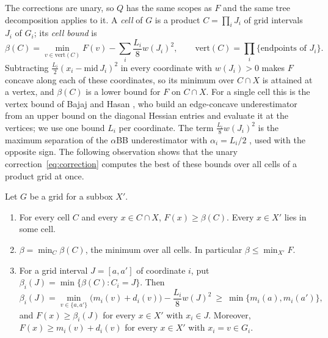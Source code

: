 The corrections are unary, so $Q$ has the same scopes as $F$ and the same
tree decomposition applies to it. A \emph{cell} of $G$ is a product
$C=\prod_iJ_i$ of grid intervals $J_i$ of $G_i$; its \emph{cell bound} is
\[
\beta(C)=\min_{v\in\mathrm{vert}(C)}F(v)-\sum_i\frac{L_i}{8}w(J_i)^2,
\qquad\mathrm{vert}(C)=\prod_i\{\text{endpoints of }J_i\}.
\]
Subtracting $\frac{L_i}2(x_i-\mathrm{mid}\,J_i)^2$ in every coordinate with
$w(J_i)>0$ makes $F$ concave along each of these coordinates, so its minimum
over $C\cap X$ is attained at a vertex, and $\beta(C)$ is a lower bound for
$F$ on $C\cap X$. For a single cell
this is the vertex bound of Bajaj and Hasan \cite{BajajHasan2020}, who build
an edge-concave underestimator from an upper bound on the diagonal Hessian
entries and evaluate it at the vertices; we use one bound $L_i$ per
coordinate. The term $\frac{L_i}8w(J_i)^2$ is the maximum
separation of the $\alpha$BB underestimator with $\alpha_i=L_i/2$
\cite{MaranasFloudas1994,AdjimanEtAl1998}, used with the opposite sign. The
following observation shows that the unary correction~\eqref{eq:correction}
computes the best of these bounds over all cells of a product grid at once.

\begin{proposition}\label{prop:cellwise}
Let $G$ be a grid for a subbox $X'$.
\begin{enumerate}[label=(\alph*)]
\item For every cell $C$ and every $x\in C\cap X$, $F(x)\ge\beta(C)$. Every
$x\in X'$ lies in some cell.
\item $\beta=\min_C\beta(C)$, the minimum over all cells. In particular
$\beta\le\min_{X'}F$.
\item For a grid interval $J=[a,a']$ of coordinate $i$, put
$\beta_i(J)=\min\{\beta(C):C_i=J\}$. Then
\[
\beta_i(J)=\min_{v\in\{a,a'\}}\bigl(m_i(v)+d_i(v)\bigr)-\frac{L_i}8w(J)^2
\ \ge\ \min\{m_i(a),m_i(a')\},
\]
and $F(x)\ge\beta_i(J)$ for every $x\in X'$ with $x_i\in J$. Moreover,
$F(x)\ge m_i(v)+d_i(v)$ for every $x\in X'$ with $x_i=v\in G_i$.
\end{enumerate}
\end{proposition}

